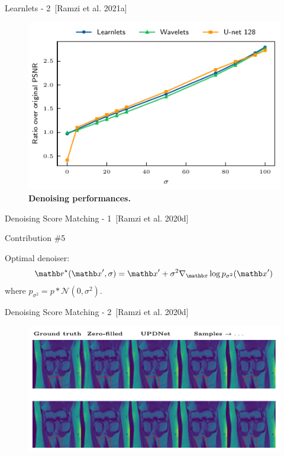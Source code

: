 \begin{frame}{Learnlets - 2~[Ramzi et al. 2021a]}
    \begin{figure}[ht]
        \includegraphics[height=0.78\textheight]{Figures/clinic_applic/model_comparison.pdf}
        \caption{\textbf{Denoising performances.}}
        \end{figure}
\end{frame}

\begin{frame}{Denoising Score Matching - 1~[Ramzi et al. 2020d]}
    \begin{exampleblock}{Contribution \#5}
    \end{exampleblock}
    Optimal denoiser:
    \begin{equation*}
        \rb^\star(\xb', \sigma) = \xb' + \sigma^2 \nabla_{\xb} \log p_{\sigma^2}(\xb')
    \end{equation*}
    where $p_{\sigma^2} = p \ast \mathcal{N}(0, \sigma^2)$.
\end{frame}

\begin{frame}{Denoising Score Matching - 2~[Ramzi et al. 2020d]}
    \begin{figure}
        \centering
        \includegraphics[width=\textwidth]{Figures/clinic_applic/dsm_main.pdf}
    \end{figure}

\end{frame}
